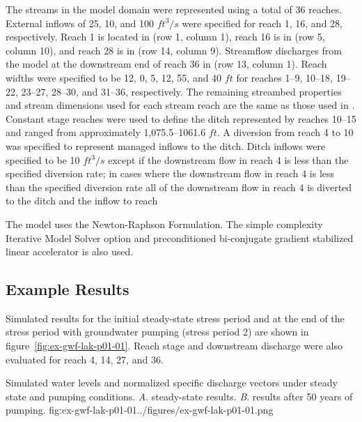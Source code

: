 The streams in the model domain were represented using a total of 36 reaches. External inflows of 25, 10, and 100 $ft^{3}/s$ were specified for reach 1, 16, and 28, respectively. Reach 1 is located in (row 1, column 1), reach 16 is in (row 5, column 10), and reach 28 is in (row 14, column 9). Streamflow discharges from the model at the downstream end of reach 36 in (row 13, column 1). Reach widths were specified to be 12, 0, 5, 12, 55, and 40 $ft$ for reaches 1--9, 10--18, 19--22, 23--27, 28--30, and 31--36, respectively. The remaining streambed properties and stream dimensions used for each stream reach are the same as those used in 
 \cite{modflowsfr1pack} \cite[see][Table~1]{modflowsfr1pack}. Constant stage reaches were used to define the ditch represented by reaches 10--15 and ranged from approximately 1,075.5--1061.6 $ft$. A diversion from reach 4 to 10 was specified to represent managed inflows to the ditch. Ditch inflows were specified to be 10 $ft^{3}/s$ except if the downstream flow in reach 4 is less than the specified diversion rate; in cases where the downstream flow in reach 4 is less than the specified diversion rate all of the downstream flow in reach 4 is diverted to the ditch and the inflow to reach

The model uses the Newton-Raphson Formulation. The simple complexity Iterative Model Solver option and preconditioned bi-conjugate gradient stabilized linear accelerator is also used.

\subsection{Example Results}

Simulated results for the initial steady-state stress period and at the end of the stress period with groundwater pumping (stress period 2) are shown in figure~\ref{fig:ex-gwf-lak-p01-01}. Reach stage and downstream discharge were also evaluated for reach 4, 14, 27, and 36.

\begin{StandardFigure}{
                                     Simulated water levels and normalized specific discharge vectors  
                                     under steady state and pumping conditions. 
                                     \textit{A}. steady-state results.
                                     \textit{B}. results after 50 years of pumping.
                                     }{fig:ex-gwf-lak-p01-01}{../figures/ex-gwf-lak-p01-01.png}
\end{StandardFigure}                                 

